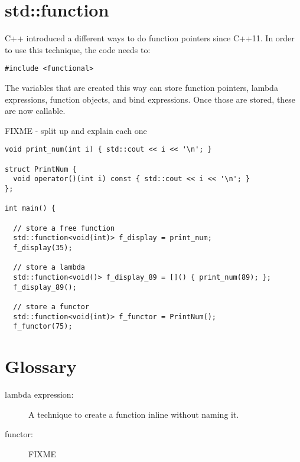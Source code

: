 \section{std::function}
C++ introduced a different ways to do function pointers since C++11. In order to use this
technique, the code needs to: 
\begin{lstlisting}
#include <functional>
\end{lstlisting}
The variables that are created this way can store function pointers, lambda expressions, 
function objects, and bind expressions. Once those are stored, these are now callable.

FIXME - split up and explain each one
\begin{lstlisting}
void print_num(int i) { std::cout << i << '\n'; }

struct PrintNum {
  void operator()(int i) const { std::cout << i << '\n'; }
};

int main() {
 
  // store a free function
  std::function<void(int)> f_display = print_num;
  f_display(35);

  // store a lambda
  std::function<void()> f_display_89 = []() { print_num(89); };
  f_display_89();

  // store a functor
  std::function<void(int)> f_functor = PrintNum();
  f_functor(75);
\end{lstlisting}
 
\section{Glossary}

\begin{description}
\item[lambda expression:] A technique to create a function inline without naming it.
\item[functor:] FIXME
\end{description}
